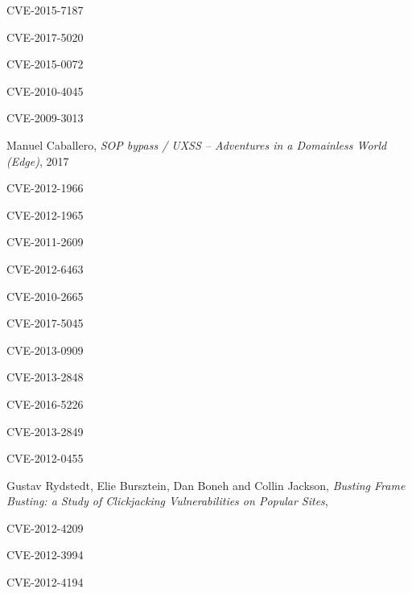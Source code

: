 \documentclass[journal]{IEEEtran}
\begin{document}
\begin{thebibliography}{1}
CVE-2015-7187

CVE-2017-5020

CVE-2015-0072

CVE-2010-4045

CVE-2009-3013

Manuel Caballero,
\textit{SOP bypass / UXSS – Adventures in a Domainless World (Edge)},
2017

CVE-2012-1966

CVE-2012-1965

CVE-2011-2609

CVE-2012-6463

CVE-2010-2665

CVE-2017-5045

CVE-2013-0909

CVE-2013-2848

CVE-2016-5226

CVE-2013-2849

CVE-2012-0455

Gustav Rydstedt, Elie Bursztein, Dan Boneh and Collin Jackson,
\textit{Busting Frame Busting:
a Study of Clickjacking Vulnerabilities on Popular Sites},

CVE-2012-4209

CVE-2012-3994

CVE-2012-4194

\end{thebibliography}

\ifCLASSOPTIONcaptionsoff
  \newpage
\fi





%
%
%
\end{document}
